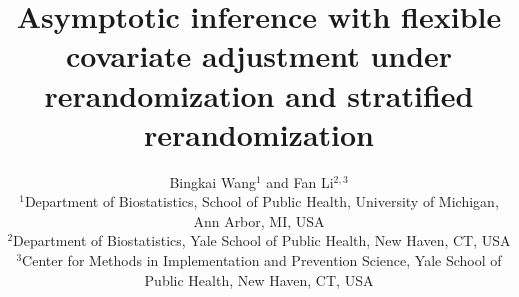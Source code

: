 \documentclass[12pt]{article}
\title{Asymptotic inference with flexible covariate adjustment under rerandomization and stratified rerandomization}
\author{Bingkai Wang$^{1}$ and Fan Li$^{2,3}$
\vspace{10pt}

$^1$Department of Biostatistics, School of Public Health, University of Michigan, Ann Arbor, MI, USA

$^{2}$Department of Biostatistics, Yale School of Public Health, New Haven, CT, USA

$^{3}$Center for Methods in Implementation and Prevention Science, Yale School of Public Health, New Haven, CT, USA}
\begin{document}
\def\spacingset#1{\renewcommand{\baselinestretch}%
{#1}\small\normalsize} \spacingset{1}

\date{\vspace{-5ex}}

\maketitle
\begin{abstract}

\end{abstract}
\end{document}
